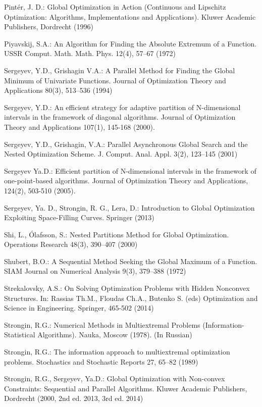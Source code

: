 \documentclass[smallextended]{svjour3}
\begin{document}
\begin{thebibliography}{}
Pintér, J. D.: Global Optimization in Action (Continuous and Lipschitz Optimization: Algorithms, Implementations and Applications). Kluwer Academic Publishers, Dordrecht (1996)

Piyavskij, S.A.: An Algorithm for Finding the Absolute Extremum of a Function. USSR Comput. Math. Math. Phys. 12(4), 57--67 (1972)

Sergeyev, Y.D., Grishagin V.A.: A Parallel Method for Finding the Global Minimum of Univariate Functions. Journal of Optimization Theory and Applications  80(3), 513--536 (1994)

Sergeyev, Y.D.: An efficient strategy for adaptive partition of N-dimensional intervals in the framework of diagonal algorithms. Journal of Optimization Theory and Applications 107(1), 145-168 (2000).

Sergeyev, Y.D., Grishagin, V.A.: Parallel Asynchronous Global Search and the Nested Optimization Scheme. J. Comput. Anal. Appl.  3(2), 123--145 (2001)

Sergeyev Ya.D.: Efficient partition of N-dimensional intervals in the framework of one-point-based algorithms. Journal of Optimization Theory and Applications, 124(2), 503-510 (2005).

Sergeyev, Ya. D., Strongin, R. G., Lera, D.: Introduction to Global Optimization Exploiting Space-Filling Curves. Springer (2013)

Shi, L., Ólafsson, S.: Nested Partitions Method for Global Optimization. Operations Research 48(3), 390--407 (2000)

Shubert, B.O.: A Sequential Method Seeking the Global Maximum of a Function. SIAM Journal on Numerical Analysis 9(3), 379--388 (1972)

Strekalovsky, A.S.: On Solving Optimization Problems with Hidden Nonconvex Structures. In: Rassias Th.M., Floudas Ch.A., Butenko S. (eds) Optimization and Science in Engineering. Springer, 465-502 (2014)

Strongin, R.G.: Numerical Methods in Multiextremal Problems (Information-Statistical Algorithms). Nauka, Moscow (1978). (In Russian)

Strongin, R.G.: The information approach to multiextremal optimization problems. Stochastics and Stochastic Reports 27, 65--82 (1989)

Strongin, R.G., Sergeyev, Ya.D.: Global Optimization with Non-convex Constraints: Sequential and Parallel Algorithms. Kluwer Academic Publishers, Dordrecht (2000, 2nd ed. 2013, 3rd ed. 2014)


\end{thebibliography}
\end{document}

